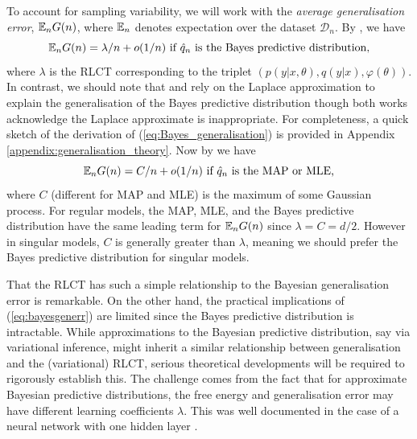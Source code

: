 \documentclass{article} %
\begin{document}
To account for sampling variability, we will work with the \textit{average generalisation error}, ${\mathbb{E}}_n G(n)$, where ${\mathbb{E}}_n$ denotes expectation over the dataset $\mathcal D_n$.
By {\citet[Theorem 1.2 and Theorem 7.2]{watanabe_algebraic_2009}}, we have
\begin{equation}
{\mathbb{E}}_n G(n) = \lambda/n + o(1/n)  \text{ if $\hat q_n$ is the Bayes predictive distribution,}
\label{eq:Bayes_generalisation}
\end{equation}
where $\lambda$ is the RLCT corresponding to the triplet $( p(y|x,\theta), q(y|x), \varphi(\theta) )$. In contrast, we should note that \citet{zhang_energyentropy_2018} and  \citet{smith2017bayesian} rely on the Laplace approximation to explain the generalisation of the Bayes predictive distribution though both works acknowledge the Laplace approximate is inappropriate. For completeness, a quick sketch of the derivation of (\ref{eq:Bayes_generalisation}) is provided in Appendix \ref{appendix:generalisation_theory}.
Now by {\cite[Theorem 6.4]{watanabe_algebraic_2009}} we have
\begin{equation}
{\mathbb{E}}_n G(n) = C/n + o(1/n)   \text{ if $\hat q_n$ is the MAP or MLE,}
\label{eq:map_generalisation}
\end{equation}
where $C$ (different for MAP and MLE) is the maximum of some Gaussian process. For regular models, the MAP, MLE, and the Bayes predictive distribution have the same leading term for ${\mathbb{E}}_n G(n)$ since $\lambda = C = d/2$. However in singular models, $C$ is generally greater than $\lambda$, meaning we should prefer the Bayes predictive distribution for singular models.

That the RLCT has such a simple relationship to the Bayesian generalisation error is remarkable. On the other hand, the practical implications of (\ref{eq:bayesgenerr}) are limited since the Bayes predictive distribution is intractable. While approximations to the Bayesian predictive distribution, say via variational inference, might inherit a similar relationship between generalisation and the (variational) RLCT, serious theoretical developments will be required to rigorously establish this. The challenge comes from the fact that for approximate Bayesian predictive distributions, the free energy and generalisation error may have different learning coefficients $\lambda$. This was well documented in the case of a neural network with one hidden layer \citep{nakajima_variational_2007}.  
\end{document}
